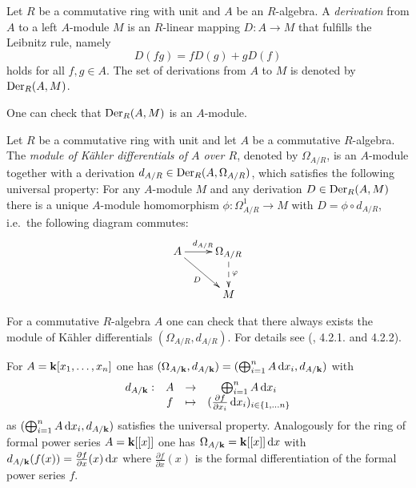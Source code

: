 \begin{defi}
Let $R$ be a commutative ring with unit and $A$ be an $R$-algebra. A \emph{derivation} from $A$ to a left $A$-module $M$ is an $R$-linear mapping $D:A \to M$ that fulfills the Leibnitz rule, namely \[D(fg) = fD(g) + gD(f)\] holds for all $f,g \in A$.   
The set of derivations from $A$ to $M$ is denoted by $\operatorname{Der}_R(A,M)$.
\end{defi}
 One can check that $\operatorname{Der}_R(A,M)$ is an $A$-module.


\begin{defi} Let $R$ be a commutative ring with unit and let $A$ be a commutative $R$-algebra.
    The \emph{module of Kähler differentials of $A$ over $R$}, denoted by $\Omega_{A/R}$, is an $A$-module together with a derivation $d_{A/R} \in \operatorname{Der}_R(A, \Omega_{A/R})$, which satisfies the following universal property: For any $A$-module $M$ and any derivation $D\in \operatorname{Der}_R(A,M)$ there is a unique $A$-module homomorphism $\phi: \Omega_{A/R}^1 \to M$ with $D= \phi \circ d_{A/R}$, i.e.\ the following diagram commutes:
    \[
    \begin{xy}
    \xymatrix{
    A \ar[r]^{d_{A/R}} \ar[rd]_D & \Omega_{A/R} \ar@{-->}[d]^\phi \\ 
    & M 
    }
    \end{xy}
    \]
\end{defi}

\begin{rem}
    For a commutative $R$-algebra $A$ one can check that there always exists the module of Kähler differentials $(\Omega_{A/R}, d_{A/R})$. For details see (\cite{LinAlg}, 4.2.1. and  4.2.2). 
\end{rem}


\begin{ex}\label{KaehlerBsp}
For $A = \mathbf{k}[x_1,\dots,x_n]$ one has $(\Omega_{A/\mathbf{k}}, d_{A/\mathbf{k}}) = (\bigoplus_{i=1}^n A \mathop{}\!\mathrm{d}{x_i}, d_{A/\mathbf{k}})$ with 
\[
\begin{matrix}
    d_{A/\mathbf{k}}: & A & \to & \bigoplus_{i=1}^n A \mathop{}\!\mathrm{d}{x_i} \\
    & f & \mapsto & (\frac{\partial f}{\partial x_i} \mathop{}\!\mathrm{d}{x_i})_{i \in \{1, \dots n\}}
\end{matrix}
\] as $(\bigoplus_{i=1}^n A \mathop{}\!\mathrm{d}{x_i}, d_{A/\mathbf{k}})$ satisfies the universal property. Analogously for the ring of formal power series $A = \mathbf{k}[[x]]$ one has $\Omega_{A/\mathbf{k}} = \mathbf{k}[[x]]\mathop{}\!\mathrm{d}{x}$ with $d_{A/\mathbf{k}}(f(x)) = \frac{\partial f}{\partial x}(x) \mathop{}\!\mathrm{d}{x}$ where $\frac{\partial f}{\partial x}(x)$ is the formal differentiation of the formal power series $f$.
\end{ex}

